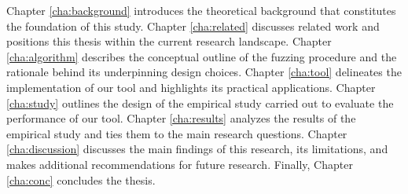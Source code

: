 Chapter \ref{cha:background} introduces the theoretical background
that constitutes the foundation of this study.
Chapter \ref{cha:related} discusses related work and positions this
thesis within the current research landscape.
Chapter \ref{cha:algorithm} describes the conceptual outline of
the fuzzing procedure and the rationale behind its
underpinning design choices.
Chapter \ref{cha:tool} delineates the implementation
of our tool and highlights its practical applications.
Chapter \ref{cha:study} outlines the design of the empirical
study carried out to evaluate the performance of our tool.
Chapter \ref{cha:results} analyzes the results of the empirical study
and ties them to the main research questions.
Chapter \ref{cha:discussion} discusses the main 
findings of this research, its limitations, and makes additional recommendations for future research.
Finally, Chapter \ref{cha:conc} concludes the thesis.

